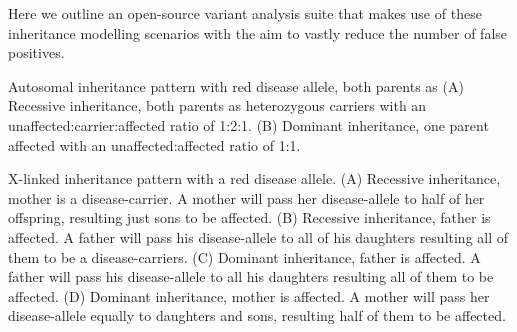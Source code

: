 Here we outline an open-source variant analysis suite that makes use of these inheritance modelling scenarios with the aim to vastly reduce the number of false positives.


	{Autosomal inheritance pattern with red disease allele, both parents as 
(A) Recessive inheritance, both parents as heterozygous carriers with an unaffected:carrier:affected ratio of 1:2:1.
(B) Dominant inheritance, one parent affected with an unaffected:affected ratio of 1:1.}
	
	{X-linked inheritance pattern with a red disease allele.
(A) Recessive inheritance, mother is a disease-carrier. A mother will pass her disease-allele
to half of her offspring, resulting just sons to be affected.
(B) Recessive inheritance, father is affected. A father will pass his disease-allele to all of
his daughters resulting all of them to be a disease-carriers.
(C) Dominant inheritance, father is affected. A father will pass his disease-allele to all his
daughters resulting all of them to be affected. 
(D) Dominant inheritance, mother is affected. A mother will pass her disease-allele
equally to daughters and sons, resulting half of them to be affected.}

